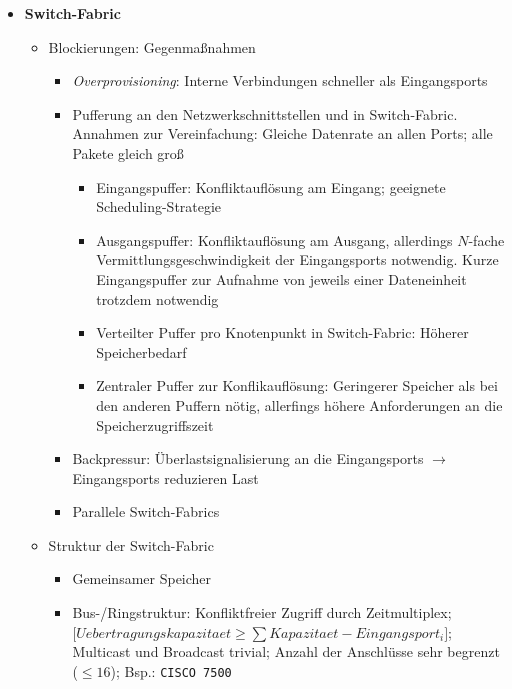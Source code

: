 \begin{itemize}
\begin{itemize}
\begin{figure}[!h]
		\end{figure}
	\end{itemize}
	\item \textbf{Switch-Fabric}
	\begin{itemize}
		\item Blockierungen: Gegenmaßnahmen
		\begin{itemize}
			\item \textit{Overprovisioning}: Interne Verbindungen schneller als Eingangsports
			\item Pufferung an den Netzwerkschnittstellen und in Switch-Fabric. Annahmen zur Vereinfachung: Gleiche Datenrate an allen Ports; alle Pakete gleich groß
			\begin{itemize}
				\item Eingangspuffer: Konfliktauflösung am Eingang; geeignete Scheduling-Strategie
				\item Ausgangspuffer: Konfliktauflösung am Ausgang, allerdings \(N\)-fache Vermittlungsgeschwindigkeit der Eingangsports notwendig. Kurze Eingangspuffer zur Aufnahme von jeweils einer Dateneinheit trotzdem notwendig
				\item Verteilter Puffer pro Knotenpunkt in Switch-Fabric: Höherer Speicherbedarf
				\item Zentraler Puffer zur Konflikauflösung: Geringerer Speicher als bei den anderen Puffern nötig, allerfings höhere Anforderungen an die Speicherzugriffszeit 
			\end{itemize}
			\item Backpressur: Überlastsignalisierung an die Eingangsports \(\rightarrow\) Eingangsports reduzieren Last
			\item Parallele Switch-Fabrics
		\end{itemize}
		\item Struktur der Switch-Fabric
		\begin{itemize}
			\item Gemeinsamer Speicher
			\item Bus-/Ringstruktur: Konfliktfreier Zugriff durch Zeitmultiplex; \(\big\lbrack Uebertragungskapazitaet \ge \sum Kapazitaet-Eingangsport_i\big\rbrack \); Multicast und Broadcast trivial; Anzahl der Anschlüsse sehr begrenzt (\(\le 16\)); Bsp.: \texttt{CISCO 7500}

\end{itemize}
\end{itemize}
\end{itemize}
